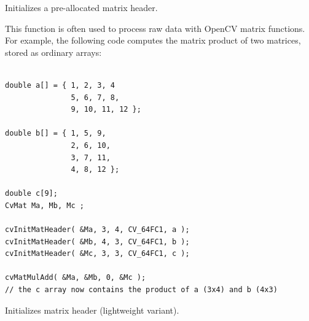 Initializes a pre-allocated matrix header.


\begin{description}
\end{description}

This function is often used to process raw data with OpenCV matrix functions. For example, the following code computes the matrix product of two matrices, stored as ordinary arrays:

\begin{lstlisting}

double a[] = { 1, 2, 3, 4
               5, 6, 7, 8,
               9, 10, 11, 12 };

double b[] = { 1, 5, 9,
               2, 6, 10,
               3, 7, 11,
               4, 8, 12 };

double c[9];
CvMat Ma, Mb, Mc ;

cvInitMatHeader( &Ma, 3, 4, CV_64FC1, a );
cvInitMatHeader( &Mb, 4, 3, CV_64FC1, b );
cvInitMatHeader( &Mc, 3, 3, CV_64FC1, c );

cvMatMulAdd( &Ma, &Mb, 0, &Mc );
// the c array now contains the product of a (3x4) and b (4x3)

\end{lstlisting}

\label{Mat}

Initializes matrix header (lightweight variant).


